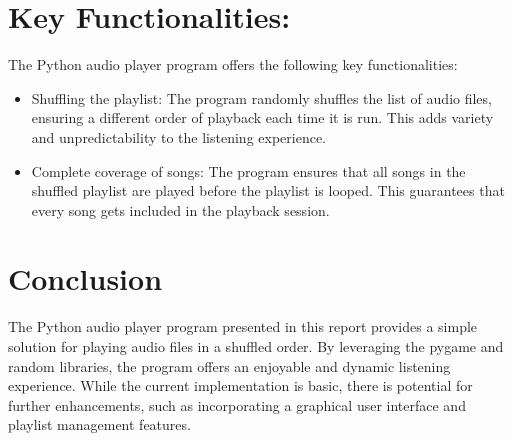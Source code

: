 \documentclass{article}
\begin{document}
\section{Key Functionalities:}
 The Python audio player program offers the following key functionalities:
 \begin{itemize}
     \item Shuffling the playlist: The program randomly shuffles the list of audio files, ensuring a different order of playback each time it is run. This adds variety and unpredictability to the listening experience.
     \item Complete coverage of songs: The program ensures that all songs in the shuffled playlist are played before the playlist is looped. This guarantees that every song gets included in the playback session.
 \end{itemize}


\section{Conclusion}
 The Python audio player program presented in this report provides a simple solution for playing audio files in a shuffled order. By leveraging the pygame and random libraries, the program offers an enjoyable and dynamic listening experience. While the current implementation is basic, there is potential for further enhancements, such as incorporating a graphical user interface and playlist management features.
\end{document}
